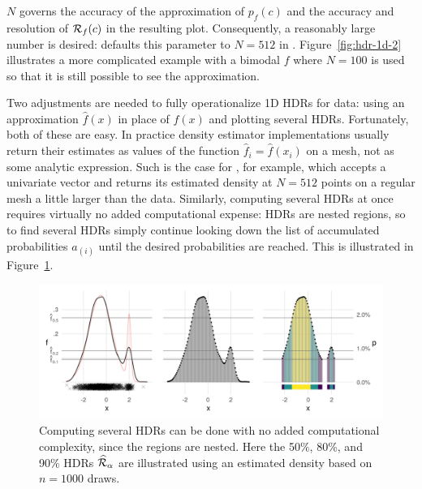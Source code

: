 $N$ governs the accuracy of the approximation of $p_{f}(c)$ and the accuracy and resolution of $\mathcal{R}_{f}(c)$ in the resulting plot. Consequently, a reasonably large number is desired:  defaults this parameter to $N = 512$ in .
Figure~\ref{fig:hdr-1d-2} illustrates a more complicated example with a bimodal $f$ where $N = 100$ is used so that it is still possible to see the approximation.

Two adjustments are needed to fully operationalize 1D HDRs for data: using an approximation $\hat{f}(x)$ in place of $f(x)$ and plotting several HDRs. Fortunately, both of these are easy. In practice density estimator implementations usually return their estimates as values of the function $\hat{f}_{i} = \hat{f}(x_{i})$ on a mesh, not as some analytic expression. Such is the case for , for example, which accepts a univariate vector and returns its estimated density at $N = 512$ points on a regular mesh a little larger than the data. Similarly, computing several HDRs at once requires virtually no added computational expense: HDRs are nested regions, so to find several HDRs simply continue looking down the list of accumulated probabilities $a_{(i)}$ until the desired probabilities are reached. This is illustrated in Figure~\ref{fig:hdr-1d-3}.



\begin{knitrout}
\color{fgcolor}\begin{figure}[h!]

{\centering \includegraphics[width=\maxwidth]{figures/hdr-1d-3-1}

}

\caption{Computing several HDRs can be done with no added computational complexity, since the regions are nested. Here the 50\%, 80\%, and 90\% HDRs $\widehat{\mathcal{R}}_{\alpha}$ are illustrated using an estimated density based on $n = 1000$ draws.}\label{fig:hdr-1d-3}
\end{figure}

\end{knitrout}



